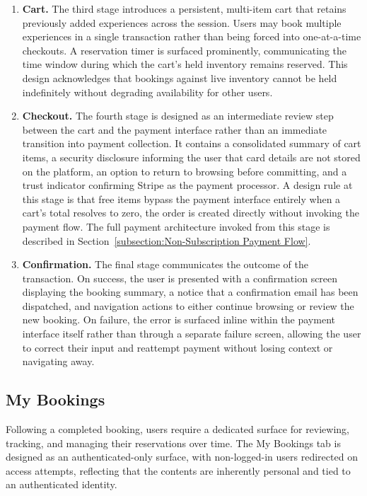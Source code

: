 \begin{enumerate}
    \item \textbf{Cart.} The third stage introduces a persistent, multi-item cart that retains previously added experiences across the session. Users may book multiple experiences in a single transaction rather than being forced into one-at-a-time checkouts. A reservation timer is surfaced prominently, communicating the time window during which the cart's held inventory remains reserved. This design acknowledges that bookings against live inventory cannot be held indefinitely without degrading availability for other users.

    \item \textbf{Checkout.} The fourth stage is designed as an intermediate review step between the cart and the payment interface rather than an immediate transition into payment collection. It contains a consolidated summary of cart items, a security disclosure informing the user that card details are not stored on the platform, an option to return to browsing before committing, and a trust indicator confirming Stripe as the payment processor. A design rule at this stage is that free items bypass the payment interface entirely when a cart's total resolves to zero, the order is created directly without invoking the payment flow. The full payment architecture invoked from this stage is described in Section~\ref{subsection:Non-Subscription Payment Flow}.

    \item \textbf{Confirmation.} The final stage communicates the outcome of the transaction. On success, the user is presented with a confirmation screen displaying the booking summary, a notice that a confirmation email has been dispatched, and navigation actions to either continue browsing or review the new booking. On failure, the error is surfaced inline within the payment interface itself rather than through a separate failure screen, allowing the user to correct their input and reattempt payment without losing context or navigating away.
\end{enumerate}

\subsection{My Bookings}
Following a completed booking, users require a dedicated surface for reviewing, tracking, and managing their reservations over time. The My Bookings tab is designed as an authenticated-only surface, with non-logged-in users redirected on access attempts, reflecting that the contents are inherently personal and tied to an authenticated identity.

